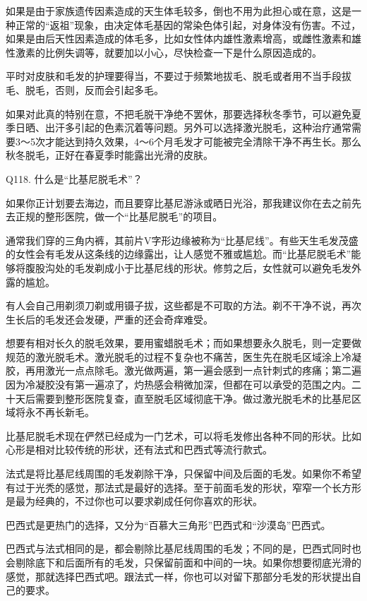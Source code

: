 \documentclass[12pt,UTF8]{ctexbook}
\begin{document}
如果是由于家族遗传因素造成的天生体毛较多，倒也不用为此担心或在意，这是一种正常的“返祖”现象，由决定体毛基因的常染色体引起，对身体没有伤害。不过，如果是由后天性因素造成的体毛多，比如女性体内雄性激素增高，或雌性激素和雄性激素的比例失调等，就要加以小心，尽快检查一下是什么原因造成的。

平时对皮肤和毛发的护理要得当，不要过于频繁地拔毛、脱毛或者用不当手段拔毛、脱毛，否则，反而会引起多毛。

如果对此真的特别在意，不把毛脱干净绝不罢休，那要选择秋冬季节，可以避免夏季日晒、出汗多引起的色素沉着等问题。另外可以选择激光脱毛，这种治疗通常需要3～5次才能达到持久效果，4～6个月毛发才可能被完全清除干净不再生长。那么秋冬脱毛，正好在春夏季时能露出光滑的皮肤。





Q118. 什么是“比基尼脱毛术”？

如果你正计划要去海边，而且要穿比基尼游泳或晒日光浴，那我建议你在去之前先去正规的整形医院，做一个“比基尼脱毛”的项目。

通常我们穿的三角内裤，其前片V字形边缘被称为“比基尼线”。有些天生毛发茂盛的女性会有毛发从这条线的边缘露出，让人感觉不雅或尴尬。而“比基尼脱毛术”能够将腹股沟处的毛发剃成小于比基尼线的形状。修剪之后，女性就可以避免毛发外露的尴尬。

有人会自己用剃须刀剃或用镊子拔，这些都是不可取的方法。剃不干净不说，再次生长后的毛发还会发硬，严重的还会奇痒难受。

想要有相对长久的脱毛效果，要用蜜蜡脱毛术；而如果想要永久脱毛，则一定要做规范的激光脱毛术。激光脱毛的过程不复杂也不痛苦，医生先在脱毛区域涂上冷凝胶，再用激光一点点除毛。激光做两遍，第一遍会感到一点针刺式的疼痛；第二遍因为冷凝胶没有第一遍凉了，灼热感会稍微加深，但都在可以承受的范围之内。二十天后需要到整形医院复查，直至脱毛区域彻底干净。做过激光脱毛术的比基尼区域将永不再长新毛。

比基尼脱毛术现在俨然已经成为一门艺术，可以将毛发修出各种不同的形状。比如心形是相对比较传统的形状，还有法式和巴西式等流行款式。

法式是将比基尼线周围的毛发剃除干净，只保留中间及后面的毛发。如果你不希望有过于光秃的感觉，那法式是最好的选择。至于前面毛发的形状，窄窄一个长方形是最为经典的，不过你也可以要求剃成任何你喜欢的形状。

巴西式是更热门的选择，又分为“百慕大三角形”巴西式和“沙漠岛”巴西式。

巴西式与法式相同的是，都会剔除比基尼线周围的毛发；不同的是，巴西式同时也会剔除底下和后面所有的毛发，只保留前面和中间的一块。如果你想要彻底光滑的感觉，那就选择巴西式吧。跟法式一样，你也可以对留下那部分毛发的形状提出自己的要求。
\end{document}
